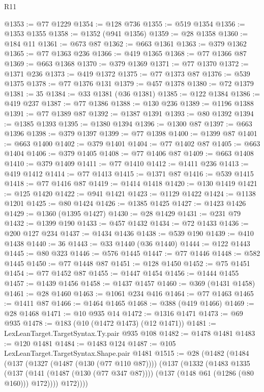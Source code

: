 \begin{lexlean}{R11}
\begin{coremodule}
@1353 := @77 @1229
@1354 := @128 @736
@1355 := @519 @1354
@1356 := @1353 @1355
@1358 := @1352 (@941 @1356)
@1359 := @28 @1358
@1360 := @184 @11
@1361 := @673 @87
@1362 := @663 @1361
@1363 := @379 @1362
@1365 := @77 @1363 @236
@1366 := @419 @1365
@1368 := @77 @1366 @87
@1369 := @663 @1368
@1370 := @379 @1369
@1371 := @77 @1370
@1372 := @1371 @236
@1373 := @419 @1372
@1375 := @77 @1373 @87
@1376 := @539 @1375
@1378 := @77 @1376 @131
@1379 := @457 @1378
@1380 := @72 @1379
@1381 := 35
@1384 := @33 @1381 (@36 @1381)
@1385 := @122 @1384
@1386 := @419 @237
@1387 := @77 @1386
@1388 := @130 @236
@1389 := @1196 @1388
@1391 := @77 @1389 @87
@1392 := @1387 @1391
@1393 := @80 @1392
@1394 := @1385 @1393
@1395 := @1380 @1394
@1396 := @1300 @87
@1397 := @663 @1396
@1398 := @379 @1397
@1399 := @77 @1398
@1400 := @1399 @87
@1401 := @663 @1400
@1402 := @379 @1401
@1404 := @77 @1402 @87
@1405 := @663 @1404
@1406 := @379 @1405
@1408 := @77 @1406 @87
@1409 := @663 @1408
@1410 := @379 @1409
@1411 := @77 @1410
@1412 := @1411 @236
@1413 := @419 @1412
@1414 := @77 @1413
@1415 := @1371 @87
@1416 := @539 @1415
@1418 := @77 @1416 @87
@1419 := @1414 @1418
@1420 := @130 @1419
@1421 := @125 @1420
@1422 := @941 @1421
@1423 := @1129 @1422
@1424 := @1138 @1201
@1425 := @80 @1424
@1426 := @1385 @1425
@1427 := @1423 @1426
@1429 := @1360 (@1395 @1427)
@1430 := @28 @1429
@1431 := @231 @79
@1432 := @1399 @190
@1433 := @457 @1432
@1434 := @72 @1433
@1436 := @200 @127 @234
@1437 := @1434 @1436
@1438 := @539 @190
@1439 := @410 @1438
@1440 := 36
@1443 := @33 @1440 (@36 @1440)
@1444 := @122 @1443
@1445 := @80 @323
@1446 := @576 @1445
@1447 := @77 @1446
@1448 := @582 @1445
@1450 := @77 @1448 @87
@1451 := @128 @1450
@1452 := @75 @1451
@1454 := @77 @1452 @87
@1455 := @1447 @1454
@1456 := @1444 @1455
@1457 := @1439 @1456
@1458 := @1437 @1457
@1460 := @369 (@1431 @1458)
@1461 := @28 @1460
@1463 := @1061 @234 @416
@1464 := @77 @1463
@1465 := @1411 @87
@1466 := @1464 @1465
@1468 := @388 (@419 @1466)
@1469 := @28 @1468
@1471 := @10 @935 @14
@1472 := @1316 @1471
@1473 := @69 @935
@1478 := @183 (@10 (@1472 @1473) (@12 @1471))
@1481 := LexLeanTarget.TargetSyntax.Ty.pair @935 @108
@1482 := @1478 @1481
@1483 := @120 @1481
@1484 := @1483 @124
@1487 := @105 LexLeanTarget.TargetSyntax.Shape.pair @1481
@1515 := @28
    (@1482
      (@1484
        (@137
          (@1327 (@1487 (@130 (@77 @110 @87))))
          (@137
            (@1332
              (@1483
                @1335
                (@137
                  (@141 (@1487 (@130 (@77 @347 @87))))
                  (@137 (@148 @61 (@1286 (@80 @160))) @172))))
            @172))))

\end{coremodule}
\end{lexlean}

